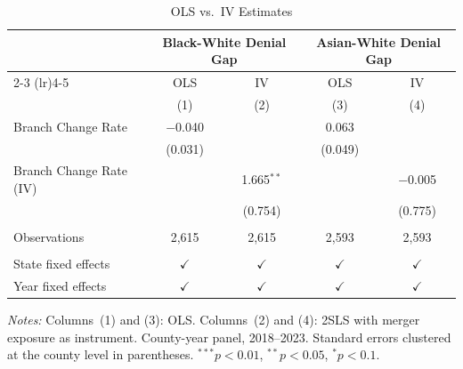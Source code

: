 
\begin{table}[htbp]
   \caption{\label{tab:ols_iv} OLS vs.\ IV Estimates}
   \bigskip
   \centering
   \begin{tabular}{lcccc}
      \toprule
       & \multicolumn{2}{c}{Black-White Denial Gap} & \multicolumn{2}{c}{Asian-White Denial Gap}\\
      \cmidrule(lr){2-3} \cmidrule(lr){4-5}
                                 & OLS           & IV            & OLS           & IV \\
                                 & (1)           & (2)           & (3)           & (4)\\
      \midrule
      Branch Change Rate         & $-$0.040      &               & 0.063         &   \\
                                 & (0.031)       &               & (0.049)       &   \\
      Branch Change Rate (IV)    &               & 1.665$^{**}$  &               & $-$0.005\\
                                 &               & (0.754)       &               & (0.775)\\
       \\
      Observations               & 2,615         & 2,615         & 2,593         & 2,593\\
       \\
      State fixed effects        & $\checkmark$  & $\checkmark$  & $\checkmark$  & $\checkmark$\\
      Year fixed effects         & $\checkmark$  & $\checkmark$  & $\checkmark$  & $\checkmark$\\
      \bottomrule
   \end{tabular}

   \par \raggedright \small
   \textit{Notes:} Columns~(1) and (3): OLS. Columns~(2) and (4): 2SLS with merger exposure as instrument. County-year panel, 2018--2023. Standard errors clustered at the county level in parentheses. $^{***}p<0.01$, $^{**}p<0.05$, $^{*}p<0.1$.
\end{table}

